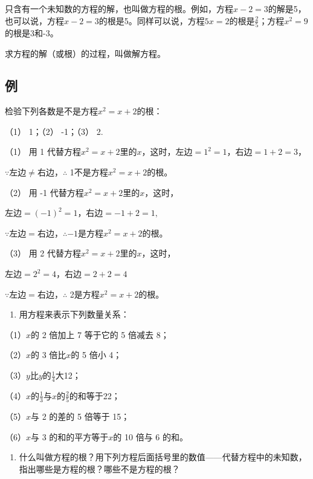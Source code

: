 只含有一个未知数的方程的解，也叫做方程的根。例如，方程\(x - 2 = 3\)的解是5，也可以说，方程\(x - 2 = 3\)的根是5。同样可以说，方程\(5x = 2\)的根是\(\frac{2}{5}\)；方程\(x^{2} = 9\)的根是3和-3。

求方程的解（或根）的过程，叫做解方程。

\subsection{例}

检验下列各数是不是方程\(x^{2} = x + 2\)的根：

（1） 1；（2） -1；（3） 2.

 （1） 用 1
代替方程\(x^{2} = x + 2\)里的\(x\)，这时，左边\(= 1^{2} = 1\)，右边\(= 1 + 2 = 3\)，

\(\because\)左边\(\neq\)右边，\(\therefore\)
1不是方程\(x^{2} = x + 2\)的根。

（2） 用 -1 代替方程\(x^{2} = x + 2\)里的\(x\)，这时，

左边\(= (-1)^{2} = 1\)，右边\(= -1 + 2 = 1,\)

\(\because\)左边\(=\)右边，\(\therefore -1\)是方程\(x^{2} = x + 2\)的根。

（3） 用 2 代替方程\(x^{2} = x + 2\)里的\(x\)，这时，

左边\(= 2^{2} = 4\)，右边\(= 2 + 2 = 4\)

\(\because\)左边\(=\)右边，\(\therefore\) 2是方程\(x^{2} = x + 2\)的根。

\begin{enumerate}
\item
  用方程来表示下列数量关系：
\end{enumerate}

（1）\(x\)的 2 倍加上 7 等于它的 5 倍减去 8；

（2）\(x\)的 3 倍比\(x\)的 5 倍小 4；

（3）\(y\)比\(y\)的\(\frac{1}{4}\)大12；

（4）\(x\)的\(\frac{1}{3}\)与\(x\)的\(\frac{2}{5}\)的和等于22；

（5）\(x\)与 2 的差的 5 倍等于 15；

（6）\(x\)与 3 的和的平方等于\(x\)的 10 倍与 6 的和。

\begin{enumerate}[start=2]
\item
  什么叫做方程的根？用下列方程后面括号里的数值------代替方程中的未知数，指出哪些是方程的根？哪些不是方程的根？
\end{enumerate}

